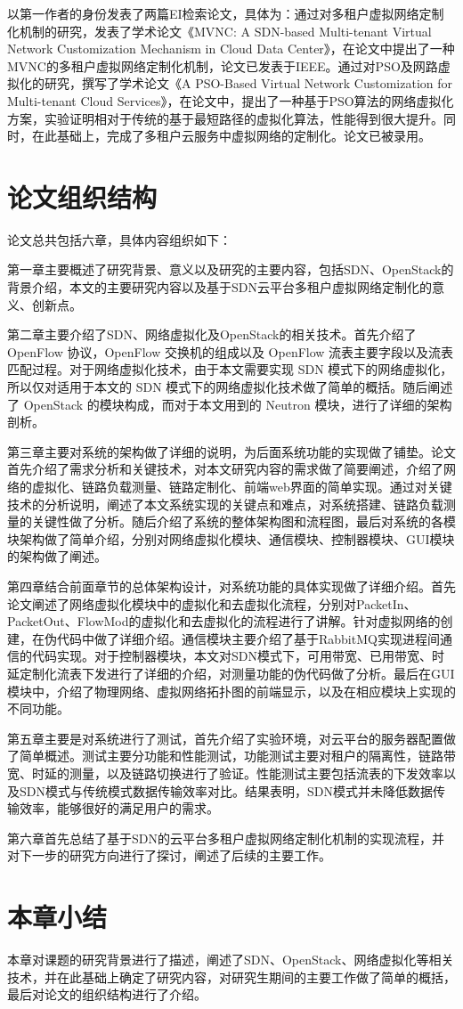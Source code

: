 以第一作者的身份发表了两篇EI检索论文，具体为：通过对多租户虚拟网络定制化机制的研究，发表了学术论文《MVNC: A SDN-based Multi-tenant Virtual Network Customization Mechanism in Cloud Data Center》，在论文中提出了一种MVNC的多租户虚拟网络定制化机制，论文已发表于IEEE。通过对\gls*{PSO}及网路虚拟化的研究，撰写了学术论文《A PSO-Based Virtual Network Customization for Multi-tenant Cloud Services》，在论文中，提出了一种基于PSO算法的网络虚拟化方案，实验证明相对于传统的基于最短路径的虚拟化算法，性能得到很大提升。同时，在此基础上，完成了多租户云服务中虚拟网络的定制化。论文已被录用。
\section{论文组织结构}
论文总共包括六章，具体内容组织如下：

第一章主要概述了研究背景、意义以及研究的主要内容，包括SDN、OpenStack的背景介绍，本文的主要研究内容以及基于SDN云平台多租户虚拟网络定制化的意义、创新点。

第二章主要介绍了SDN、网络虚拟化及OpenStack的相关技术。首先介绍了OpenFlow 协议，OpenFlow 交换机的组成以及 OpenFlow 流表主要字段以及流表匹配过程。对于网络虚拟化技术，由于本文需要实现 SDN 模式下的网络虚拟化，所以仅对适用于本文的 SDN 模式下的网络虚拟化技术做了简单的概括。随后阐述了 OpenStack 的模块构成，而对于本文用到的 Neutron 模块，进行了详细的架构剖析。

第三章主要对系统的架构做了详细的说明，为后面系统功能的实现做了铺垫。论文首先介绍了需求分析和关键技术，对本文研究内容的需求做了简要阐述，介绍了网络的虚拟化、链路负载测量、链路定制化、前端web界面的简单实现。通过对关键技术的分析说明，阐述了本文系统实现的关键点和难点，对系统搭建、链路负载测量的关键性做了分析。随后介绍了系统的整体架构图和流程图，最后对系统的各模块架构做了简单介绍，分别对网络虚拟化模块、通信模块、控制器模块、GUI模块的架构做了阐述。

第四章结合前面章节的总体架构设计，对系统功能的具体实现做了详细介绍。首先论文阐述了网络虚拟化模块中的虚拟化和去虚拟化流程，分别对PacketIn、PacketOut、FlowMod的虚拟化和去虚拟化的流程进行了讲解。针对虚拟网络的创建，在伪代码中做了详细介绍。通信模块主要介绍了基于RabbitMQ实现进程间通信的代码实现。对于控制器模块，本文对SDN模式下，可用带宽、已用带宽、时延定制化流表下发进行了详细的介绍，对测量功能的伪代码做了分析。最后在GUI模块中，介绍了物理网络、虚拟网络拓扑图的前端显示，以及在相应模块上实现的不同功能。

第五章主要是对系统进行了测试，首先介绍了实验环境，对云平台的服务器配置做了简单概述。测试主要分功能和性能测试，功能测试主要对租户的隔离性，链路带宽、时延的测量，以及链路切换进行了验证。性能测试主要包括流表的下发效率以及SDN模式与传统模式数据传输效率对比。结果表明，SDN模式并未降低数据传输效率，能够很好的满足用户的需求。

第六章首先总结了基于SDN的云平台多租户虚拟网络定制化机制的实现流程，并对下一步的研究方向进行了探讨，阐述了后续的主要工作。

\section{本章小结}
本章对课题的研究背景进行了描述，阐述了SDN、OpenStack、网络虚拟化等相关技术，并在此基础上确定了研究内容，对研究生期间的主要工作做了简单的概括，最后对论文的组织结构进行了介绍。